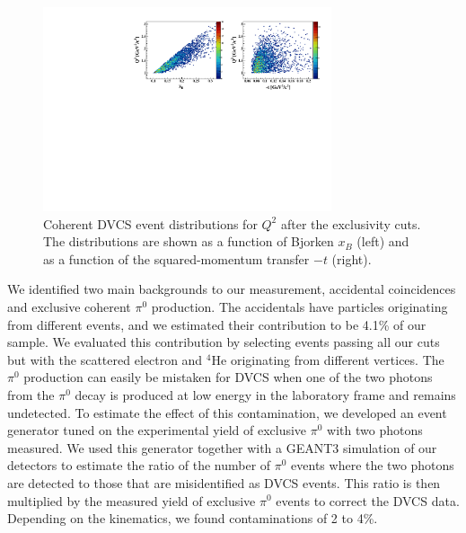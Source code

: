 \documentclass[twocolumn,nofootinbib,showpacs,prl,superscriptaddress,secnumarabic,amssymb,nobibnotes,aps,floatfix]{revtex4}
\begin{document}
\begin{figure}[tb]
\hspace{-0.45cm}
\includegraphics[width=8.5cm]{figs/Q2_xB_t_Coh.pdf}
\caption{Coherent DVCS event distributions for $Q^2$ after the exclusivity cuts. 
The distributions are shown as a function of Bjorken $x_B$ (left) 
and as a function of the squared-momentum transfer $-t$ (right).}
\label{fig:kin-coverage}
\end{figure}

We identified two main backgrounds to our measurement, accidental coincidences 
and exclusive coherent
$\pi^0$ production. The accidentals have particles originating from different events,
and we estimated their contribution to be 4.1\% of our sample. We evaluated this 
contribution by selecting events passing all our cuts but with the scattered electron and 
$^4$He originating from different vertices. The $\pi^0$ production can easily
be mistaken for DVCS when one of the two photons from the $\pi^0$ 
decay is produced at low energy in the laboratory frame and remains undetected.  
To estimate the effect of this contamination, we developed an event generator 
tuned on the experimental yield of exclusive $\pi^0$ with two photons measured. 
We used this generator together with a GEANT3 simulation of our 
detectors to estimate the ratio of the number of $\pi^0$ events where the 
two photons are detected to those that are misidentified as DVCS events. This 
ratio is then multiplied by the measured yield of exclusive $\pi^0$ events to 
correct the DVCS data. Depending on the kinematics, we found contaminations of 
2 to 4\%. 
\end{document}
